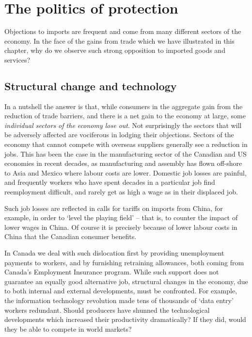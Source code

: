 \section{The politics of protection}\label{sec:ch15sec6}

Objections to imports are frequent and come from many different sectors of
the economy. In the face of the gains from trade which we have illustrated
in this chapter, why do we observe such strong opposition to imported goods
and services?

\subsection*{Structural change and technology}

In a nutshell the answer is that, while consumers in the aggregate gain from
the reduction of trade barriers, and there is a net gain to the economy at
large, some \textit{individual sectors of the economy lose out}. Not
surprisingly the sectors that will be adversely affected are vociferous in
lodging their objections. Sectors of the economy that cannot compete with
overseas suppliers generally see a reduction in jobs. This has been the case
in the manufacturing sector of the Canadian and US economies in recent
decades, as manufacturing and assembly has flown off-shore to Asia and
Mexico where labour costs are lower. Domestic job losses are painful, and
frequently workers who have spent decades in a particular job find
reemployment difficult, and rarely get as high a wage as in their displaced
job.

Such job losses are reflected in calls for tariffs on imports from China,
for example, in order to `level the playing field' -- that is, to counter
the impact of lower wages in China. Of course it is precisely because of
lower labour costs in China that the Canadian consumer benefits.

In Canada we deal with such dislocation first by providing unemployment
payments to workers, and by furnishing retraining allowances, both coming
from Canada's Employment Insurance program. While such support does not
guarantee an equally good alternative job, structural changes in the
economy, due to both internal and external developments, must be confronted.
For example, the information technology revolution made tens of thousands of
`data entry' workers redundant. Should producers have shunned the
technological developments which increased their productivity dramatically?
If they did, would they be able to compete in world markets?


